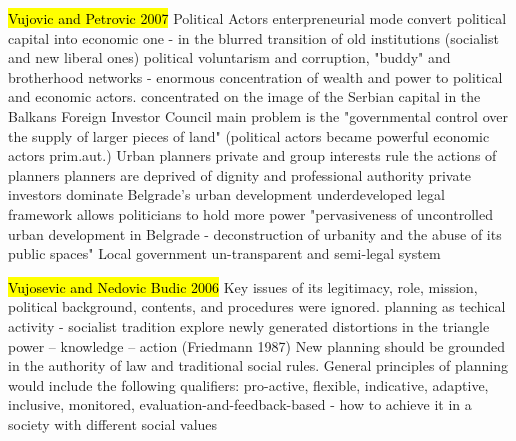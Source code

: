 \documentclass[11pt]{report}
\begin{document}
\hl{Vujovic and Petrovic 2007}
	Political Actors
enterpreneurial mode
convert political capital into economic one - in the blurred transition of old institutions (socialist and  new liberal ones)
political voluntarism and corruption, "buddy" and brotherhood networks - enormous concentration of wealth and power to political and economic actors.
concentrated on the image of the Serbian capital in the Balkans
	Foreign Investor Council
main problem is the "governmental control over the supply of larger pieces of land" (political actors became powerful economic actors prim.aut.)
	Urban planners
private and group interests rule the actions of planners
planners are deprived of dignity and professional authority
private investors dominate Belgrade's urban development
underdeveloped legal framework allows politicians to hold more power
"pervasiveness of uncontrolled urban development in Belgrade - deconstruction of urbanity and the abuse of its public spaces"
Local government un-transparent and semi-legal system
    
\hl{Vujosevic and Nedovic Budic 2006}
Key issues of its legitimacy, role, mission, political background, contents, and procedures were ignored.
planning as techical activity - socialist tradition
explore newly generated distortions in the triangle power – knowledge – action (Friedmann 1987)
New planning should be grounded in the authority of law and traditional social rules. 
General principles of planning would include the following qualifiers: pro-active, flexible, indicative, adaptive, inclusive, monitored, evaluation-and-feedback-based - how to achieve it in a society with different social values
\end{document}
